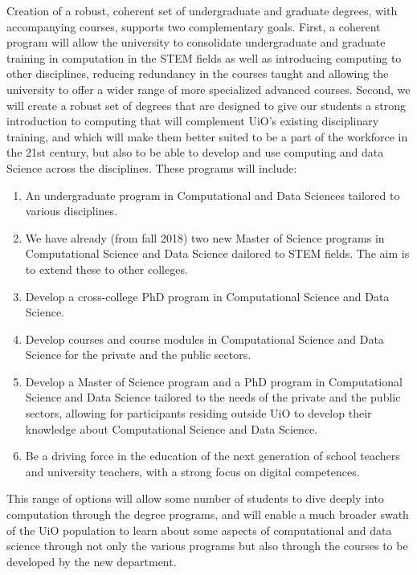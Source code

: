 \documentclass[%
oneside,                 %
final,                   %
10pt]{article}
\begin{document}
Creation of a robust, coherent set of undergraduate and graduate degrees, with accompanying
courses, supports two complementary goals. First, a coherent program will allow the university
to consolidate undergraduate and graduate training in computation in the STEM fields as well as introducing computing to other disciplines, reducing
redundancy in the courses taught and allowing the university to offer a wider range of more
specialized advanced courses. Second, we will create a robust set of degrees that are designed to give our 
students a strong introduction to computing
that will complement UiO’s existing disciplinary training, and which will make them better suited
to be a part of the workforce in the 21st century, but also to be able to develop and use computing and data Science across the disciplines. These programs will include:
\begin{enumerate}
\item An undergraduate program in Computational and Data Sciences tailored to various disciplines.

\item We have already (from fall 2018) two new Master of Science programs in Computational Science and Data Science dailored to STEM fields. The aim is to extend these to other colleges.

\item Develop a cross-college PhD program in Computational Science and Data Science.

\item Develop courses and course modules in Computational Science and Data Science for the private and the public sectors.

\item Develop a Master of Science program and a PhD program in Computational Science and Data Science tailored to the needs of the private and the public sectors, allowing for participants residing outside UiO to develop their knowledge about Computational Science and Data Science.

\item Be a driving force in the education of  the next generation of school teachers and university teachers,  with a strong focus on digital competences. 
\end{enumerate}

\noindent
This range of options will allow some number of students to dive deeply into
computation through the degree programs, and will enable a much broader swath of the UiO
population to learn about some aspects of computational and data science through not only the various programs but also through the courses to be developed by the new department. 
\end{document}
